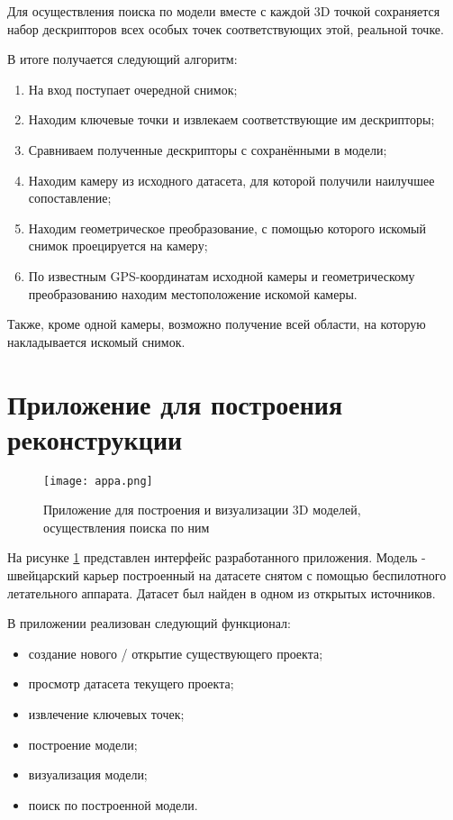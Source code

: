 Для осуществления поиска по модели вместе с каждой 3D точкой сохраняется набор дескрипторов всех особых точек соответствующих этой, реальной точке. 


\vspace{1em}
В итоге получается следующий алгоритм:
\begin{enumerate}
    \item На вход поступает очередной снимок;
    \item Находим ключевые точки и извлекаем соответствующие им дескрипторы;
    \item Сравниваем полученные дескрипторы с сохранёнными в модели;
    \item Находим камеру из исходного датасета, для которой получили наилучшее сопоставление;
    \item Находим геометрическое преобразование, с помощью которого искомый снимок проецируется на  камеру;
    \item По известным GPS-координатам исходной камеры и геометрическому преобразованию находим местоположение искомой камеры.
\end{enumerate}

\vspace{1em}
Также, кроме одной камеры, возможно получение всей области, на которую накладывается искомый снимок.

\section{Приложение для построения реконструкции}

\begin{figure}[h]
    \centering
    \texttt{[image: appa.png]}
    \caption{Приложение для построения и визуализации 3D моделей, осуществления поиска по ним}
    \label{fig:appa}
\end{figure}

На рисунке \ref{fig:appa} представлен интерфейс разработанного приложения. Модель - швейцарский карьер построенный на датасете снятом с помощью беспилотного летательного аппарата. Датасет был найден в одном из открытых источников.

\vspace{1em}
В приложении реализован следующий функционал:
\begin{itemize}
    \item создание нового / открытие существующего проекта;
    \item просмотр датасета текущего проекта;
    \item извлечение ключевых точек;
    \item построение модели;
    \item визуализация модели;
    \item поиск по построенной модели.
\end{itemize}

